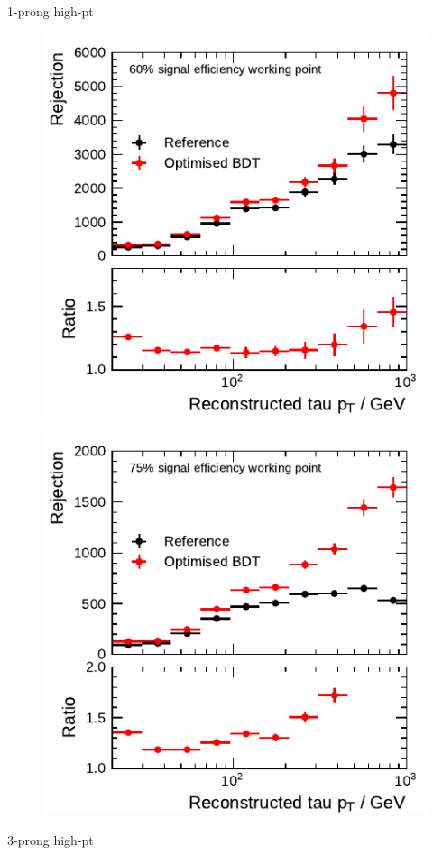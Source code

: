 \begin{minipage}{\textwidth}
\begin{subfigure}{0.48\textwidth}
  \end{subfigure}
  \caption{1-prong high-pt}
\end{minipage}

\noindent
\begin{minipage}{\textwidth}
  \centering
  \captionsetup{type=figure}
  \begin{subfigure}{0.48\textwidth}
    \centering
    \includegraphics{./figures/bdt_perf/post_optimisation/3p_highpt/rejection_medium_ratio_highpt.pdf}
  \end{subfigure}\hfill
  \begin{subfigure}{0.48\textwidth}
    \centering
    \includegraphics{./figures/bdt_perf/post_optimisation/3p_highpt/rejection_loose_ratio_highpt.pdf}
  \end{subfigure}
  \caption{3-prong high-pt}
\end{minipage}


